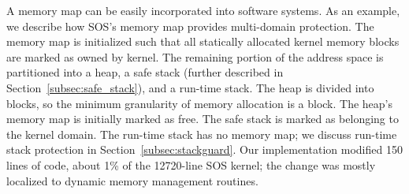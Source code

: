 %
A memory map can be easily incorporated into software systems.
%
As an example, we describe how SOS's memory map provides multi-domain protection.
%
%
The memory map is initialized such that all statically allocated kernel
memory blocks are marked as owned by kernel.
%
%
The remaining portion of the address space is partitioned into a heap,
a safe stack (further described in Section~\ref{subsec:safe_stack}), and a run-time stack.
%
The heap is divided into blocks, so the minimum granularity of 
%
memory allocation is a block.
%
%
The heap's memory map is initially marked as free.
%
The safe stack is marked as belonging to the kernel domain.
%
The run-time stack has no memory map;
%
we discuss run-time stack protection in Section~\ref{subsec:stackguard}.
%
Our implementation modified 150 lines of code, about 1\% of the 12720-line
SOS kernel; the change was
%
mostly localized to
dynamic memory management routines. 
%
%
%
%
%
%
%
%
%
%
%
%
%
%
%
%
%
%
